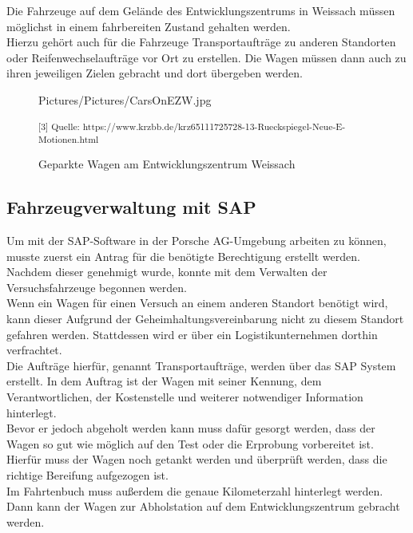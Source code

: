 Die Fahrzeuge auf dem Gelände des Entwicklungszentrums in Weissach müssen möglichst in einem fahrbereiten Zustand gehalten werden. \\
Hierzu gehört auch für die Fahrzeuge Transportaufträge zu anderen Standorten oder Reifenwechselaufträge vor Ort zu erstellen. Die Wagen müssen dann auch zu ihren jeweiligen Zielen gebracht und dort übergeben werden.

\begin{figure}[H]
	\begin{center}
		\begin{overpic}[width=\linewidth]{Pictures/Pictures/CarsOnEZW.jpg}
			
		\end{overpic}
		\label{INCA}
		\caption{Geparkte Wagen am Entwicklungszentrum Weissach}
		\small\textsuperscript{[3] Quelle: https://www.krzbb.de/krz65111725728-13-Rueckspiegel-Neue-E-Motionen.html}
	\end{center}
\end{figure}

\subsection{Fahrzeugverwaltung mit SAP}

Um mit der SAP-Software in der Porsche AG-Umgebung arbeiten zu können, musste zuerst ein Antrag für die benötigte Berechtigung erstellt werden. \\
Nachdem dieser genehmigt wurde, konnte mit dem Verwalten der Versuchsfahrzeuge begonnen werden. \\

Wenn ein Wagen für einen Versuch an einem anderen Standort benötigt wird, kann dieser Aufgrund der Geheimhaltungsvereinbarung nicht zu diesem Standort gefahren werden. Stattdessen wird er über ein Logistikunternehmen dorthin verfrachtet. \\
Die Aufträge hierfür, genannt Transportaufträge, werden über das SAP System erstellt. In dem Auftrag ist der Wagen mit seiner Kennung, dem Verantwortlichen, der Kostenstelle und weiterer notwendiger Information hinterlegt. \\
Bevor er jedoch abgeholt werden kann muss dafür gesorgt werden, dass der Wagen so gut wie möglich auf den Test oder die Erprobung vorbereitet ist. Hierfür muss der Wagen noch getankt werden und überprüft werden, dass die richtige Bereifung aufgezogen ist. \\
Im Fahrtenbuch muss außerdem die genaue Kilometerzahl hinterlegt werden. \\
Dann kann der Wagen zur Abholstation auf dem Entwicklungszentrum gebracht werden. \\

